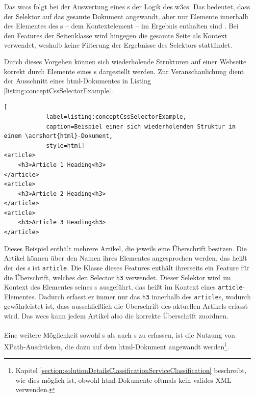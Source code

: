         Das \gls{wccs} folgt bei der Auswertung eines {\collectionFeature}s der Logik des \glspl{w3c}.
        Das bedeutet, dass der Selektor auf das gesamte Dokument angewandt,
        aber nur Elemente innerhalb des Elementes des {\parentFeature}s -- dem Kontextelement --
        im Ergebnis enthalten sind \cite{w3c:selectorsAPI}.
        Bei den Features der Seitenklasse wird hingegen die gesamte Seite als Kontext verwendet,
        weshalb keine Filterung der Ergebnisse des Selektors stattfindet.
        
        Durch dieses Vorgehen können sich wiederholende Strukturen auf einer Webseite
        korrekt durch Elemente eines {\collectionFeature}s dargestellt werden.
        Zur Veranschaulichung dient der Ausschnitt eines \gls{html}-Dokumentes
        in Listing \ref{listing:conceptCssSelectorExample}.

        \begin{lstlisting}[
            label=listing:conceptCssSelectorExample,
            caption=Beispiel einer sich wiederholenden Struktur in einem \acrshort{html}-Dokument,
            style=html]
<article>
    <h3>Article 1 Heading<h3>
</article>
<article>
    <h3>Article 2 Heading<h3>
</article>
<article>
    <h3>Article 3 Heading<h3>
</article>
        \end{lstlisting}

        Dieses Beispiel enthält mehrere Artikel, die jeweils eine Überschrift besitzen.
        Die Artikel können über den Namen ihres Elementes angesprochen werden,
        das heißt der {\cssSelector} des {\collectionFeature}s ist \texttt{article}.
        Die Klasse dieses Features enthält ihrerseits ein Feature für die Überschrift,
        welches den Selector \texttt{h3} verwendet.
        Dieser Selektor wird im Kontext des Elementes seines {\parentFeature}s ausgeführt,
        das heißt im Kontext eines \texttt{article}-Elementes.
        Dadurch erfasst er immer nur das \texttt{h3} innerhalb des \texttt{article}s,
        wodurch gewährleistet ist, dass ausschließlich die Überschrift des aktuellen Artikels erfasst wird.
        Das \gls{wccs} kann jedem Artikel also die korrekte Überschrift zuordnen.

        \paragraph{\xpathSelector}
        Eine weitere Möglichkeit sowohl {\contentFeature}s als auch {}s
        zu erfassen, ist die Nutzung von XPath-Ausdrücken,
        die dazu auf dem \gls{html}-Dokument angewandt
        werden\footnote{Kapitel \ref{section:solutionDetailsClassificationServiceClassification}
        beschreibt, wie dies möglich ist, obwohl \gls{html}-Dokumente oftmals kein
        valides XML verwenden.}.

